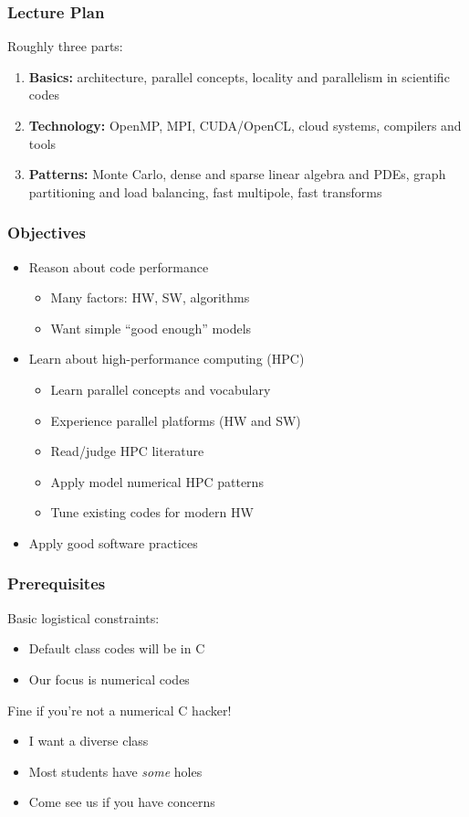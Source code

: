 \documentclass{beamer}
\begin{document}
\begin{frame}
  \frametitle{Lecture Plan}

  Roughly three parts:
  \begin{enumerate}
  \item {\bf Basics:} architecture, parallel concepts, 
    locality and parallelism in scientific codes
  \item {\bf Technology:} OpenMP, MPI, CUDA/OpenCL, cloud systems,
    compilers and tools
  \item {\bf Patterns:} Monte Carlo, dense and sparse linear algebra and PDEs,
    graph partitioning and load balancing, fast multipole, fast transforms
  \end{enumerate}
\end{frame}


\begin{frame}
  \frametitle{Objectives}

  \begin{itemize}
  \item Reason about code performance
    \begin{itemize}
    \item Many factors: HW, SW, algorithms
    \item Want simple ``good enough'' models
    \end{itemize}
  \item Learn about high-performance computing (HPC)
    \begin{itemize}
    \item Learn parallel concepts and vocabulary
    \item Experience parallel platforms (HW and SW)
    \item Read/judge HPC literature
    \item Apply model numerical HPC patterns
    \item Tune existing codes for modern HW
    \end{itemize}
  \item Apply good software practices
  \end{itemize}
\end{frame}


\begin{frame}
  \frametitle{Prerequisites}

  Basic logistical constraints:
  \begin{itemize}
  \item Default class codes will be in C
  \item Our focus is numerical codes
  \end{itemize}

  Fine if you're not a numerical C hacker!
  \begin{itemize}
  \item I want a diverse class
  \item Most students have {\em some} holes
  \item Come see us if you have concerns
  \end{itemize}
\end{frame}
\end{document}
